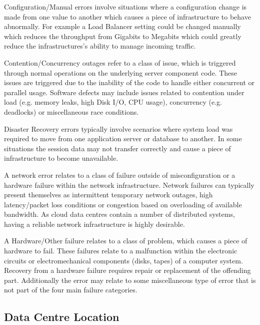 Configuration/Manual errors involve situations where a configuration change is made from one value to another which causes a piece of infrastructure to behave abnormally. For example a Load Balancer setting could be changed manually which reduces the throughput from Gigabits to Megabits which could greatly reduce the infrastructures's ability to manage incoming traffic.\par

Contention/Concurrency outages refer to a class of issue, which is triggered through normal operations on the underlying server component code. These issues are triggered due to the inability of the code to handle either concurrent or parallel usage. Software defects may include issues related to contention under load (e.g. memory leaks, high Disk I/O, CPU usage), concurrency (e.g. deadlocks) or miscellaneous race conditions. \par

Disaster Recovery errors typically involve scenarios where system load was required to move from one application server or database to another. In some situations the session data may not transfer correctly and cause a piece of infrastructure to become unavailable. \par

A network error relates to a class of failure outside of misconfiguration or a hardware failure within the network infrastructure. Network failures can typically present themselves as intermittent temporary network outages, high latency/packet loss conditions or congestion based on overloading of available bandwidth. As cloud data centres contain a number of distributed systems, having a reliable network infrastructure is highly desirable. \par

A Hardware/Other failure relates to a class of problem, which causes a piece of hardware to fail. These failures relate to a malfunction within the electronic circuits or electromechanical components (disks, tapes) of a computer system. Recovery from a hardware failure requires repair or replacement of the offending part. Additionally the error may relate to some miscellaneous type of error that is not part of the four main failure categories. \par

\subsection{Data Centre Location}

